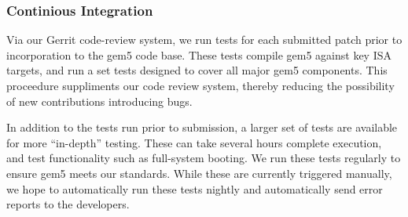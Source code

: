 \subsubsection{Continious Integration}

Via our Gerrit code-review system, we run tests for each
submitted patch prior to incorporation to the gem5 code base. These tests
compile gem5 against key ISA targets, and run a set tests designed to cover all
major gem5 components. This proceedure suppliments our code review system, thereby
reducing the possibility of new contributions introducing bugs.

In addition to the tests run prior to submission, a larger set of tests are
available for more ``in-depth'' testing. These can take several hours complete
execution, and  test functionality such as
full-system booting. We run these tests regularly to ensure gem5 meets our
standards. While these are currently triggered manually, we hope to
automatically run these tests nightly and automatically send error reports to
the developers.
